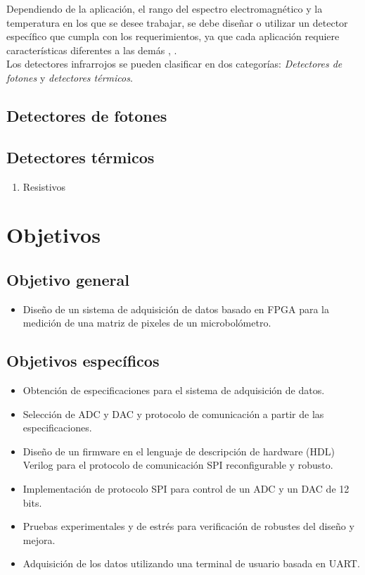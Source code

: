     Dependiendo de la aplicación, el rango del espectro electromagnético y la temperatura en los que se desee trabajar, se debe diseñar o utilizar un detector específico que cumpla con los requerimientos, ya que cada aplicación requiere características diferentes a las demás \cite{BlancoMDA}, \cite{Rogalski}.\\
    Los detectores infrarrojos se pueden clasificar en dos categorías: \textit{Detectores de fotones} y \textit{detectores térmicos}.
    
		\subsection{Detectores de fotones} 
		   
		\subsection{Detectores térmicos}
		
		\begin{enumerate}
		    \item Resistivos
		\end{enumerate}
		 
				          
		
    \section{Objetivos}
	
		\subsection{Objetivo general}
			\begin{itemize}
				\item Diseño de un sistema de adquisición de datos basado en FPGA para la medición de una matriz de pixeles de un microbolómetro.
			\end{itemize}
		
		\subsection{Objetivos específicos}
			\begin{itemize}
                \item Obtención de especificaciones para el sistema de adquisición de datos.
                \item Selección de ADC y DAC y protocolo de comunicación a partir de las especificaciones.
                \item Diseño de un firmware en el lenguaje de descripción de hardware (HDL) Verilog para el protocolo de comunicación SPI reconfigurable y robusto.
                \item Implementación de protocolo SPI para control de un ADC y un DAC de 12 bits.
                \item Pruebas experimentales y de estrés para verificación de robustes del diseño y mejora.
                \item Adquisición de los datos utilizando una terminal de usuario basada en UART.
			\end{itemize}
